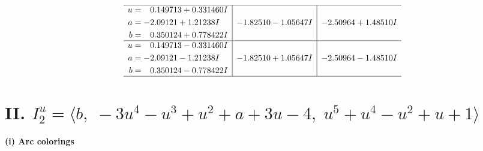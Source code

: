 \documentclass[1p]{elsarticle_modified}
\theoremstyle{definition}
\begin{document}
$$\begin{array}{c|c|c}
 \hline 
\begin{aligned}
u &= \phantom{-}0.149713 + 0.331460 I \\
a &= -2.09121 + 1.21238 I \\
b &= \phantom{-}0.350124 + 0.778422 I\end{aligned}
 & -1.82510 - 1.05647 I & -2.50964 + 1.48510 I \\ \hline\begin{aligned}
u &= \phantom{-}0.149713 - 0.331460 I \\
a &= -2.09121 - 1.21238 I \\
b &= \phantom{-}0.350124 - 0.778422 I\end{aligned}
 & -1.82510 + 1.05647 I & -2.50964 - 1.48510 I\\
 \hline 
 \end{array}$$\newpage\newpage\renewcommand{\arraystretch}{1}
\centering \section*{II. $I^u_{2}= \langle b,\;-3 u^4- u^3+u^2+a+3 u-4,\;u^5+u^4- u^2+u+1 \rangle$}
\flushleft \textbf{(i) Arc colorings}\\
\end{document}
